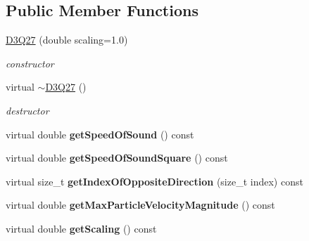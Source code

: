 \subsection*{Public Member Functions}
\begin{DoxyCompactItemize}
\item 
\hypertarget{classnatrium_1_1D3Q27_abd86172df2f60b7631d3732b86a8bad6}{
\hyperlink{classnatrium_1_1D3Q27_abd86172df2f60b7631d3732b86a8bad6}{D3Q27} (double scaling=1.0)}
\label{classnatrium_1_1D3Q27_abd86172df2f60b7631d3732b86a8bad6}

\begin{DoxyCompactList}\small\item\em constructor \item\end{DoxyCompactList}\item 
\hypertarget{classnatrium_1_1D3Q27_a0472abd51ed764619f3f761037f92e08}{
virtual \hyperlink{classnatrium_1_1D3Q27_a0472abd51ed764619f3f761037f92e08}{$\sim$D3Q27} ()}
\label{classnatrium_1_1D3Q27_a0472abd51ed764619f3f761037f92e08}

\begin{DoxyCompactList}\small\item\em destructor \item\end{DoxyCompactList}\item 
\hypertarget{classnatrium_1_1D3Q27_a66878d6b823046345df5374badbe499f}{
virtual double {\bfseries getSpeedOfSound} () const }
\label{classnatrium_1_1D3Q27_a66878d6b823046345df5374badbe499f}

\item 
\hypertarget{classnatrium_1_1D3Q27_ad810fc7813c4433638a146149b674b63}{
virtual double {\bfseries getSpeedOfSoundSquare} () const }
\label{classnatrium_1_1D3Q27_ad810fc7813c4433638a146149b674b63}

\item 
\hypertarget{classnatrium_1_1D3Q27_a28aadecf909da8bcba7ec0ba65628cc0}{
virtual size\_\-t {\bfseries getIndexOfOppositeDirection} (size\_\-t index) const }
\label{classnatrium_1_1D3Q27_a28aadecf909da8bcba7ec0ba65628cc0}

\item 
\hypertarget{classnatrium_1_1D3Q27_a1dbd203cc4524d40f37fab9b2bb27471}{
virtual double {\bfseries getMaxParticleVelocityMagnitude} () const }
\label{classnatrium_1_1D3Q27_a1dbd203cc4524d40f37fab9b2bb27471}

\item 
\hypertarget{classnatrium_1_1D3Q27_a04500e67bdea5a8f9e39bc8631d1d1f4}{
virtual double {\bfseries getScaling} () const }
\label{classnatrium_1_1D3Q27_a04500e67bdea5a8f9e39bc8631d1d1f4}

\end{DoxyCompactItemize}
